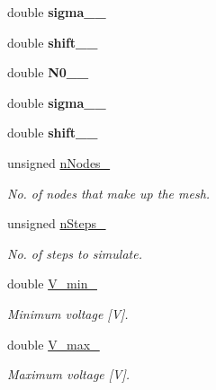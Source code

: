 \begin{DoxyCompactItemize}
\item 
\hypertarget{classParamsList_a049c8b36c29fb765c363cf05610ca9e2}{double {\bfseries sigma\-\_\-\_\-}}\label{classParamsList_a049c8b36c29fb765c363cf05610ca9e2}

\item 
\hypertarget{classParamsList_a29c887174f28cfa06e7ea7fd80185bd7}{double {\bfseries shift\-\_\-\_\-}}\label{classParamsList_a29c887174f28cfa06e7ea7fd80185bd7}

\item 
\hypertarget{classParamsList_a2c548ad5a69cd791b80ba623accf50b3}{double {\bfseries N0\-\_\-\_\-}}\label{classParamsList_a2c548ad5a69cd791b80ba623accf50b3}

\item 
\hypertarget{classParamsList_a8c6b6653287d435a1dce5f3ce3819352}{double {\bfseries sigma\-\_\-\_\-}}\label{classParamsList_a8c6b6653287d435a1dce5f3ce3819352}

\item 
\hypertarget{classParamsList_a966625893d78fcd3c8e989792b500617}{double {\bfseries shift\-\_\-\_\-}}\label{classParamsList_a966625893d78fcd3c8e989792b500617}

\item 
\hypertarget{classParamsList_a8f4bb43717322579edc12974700aec98}{unsigned \hyperlink{classParamsList_a8f4bb43717322579edc12974700aec98}{n\-Nodes\-\_\-}}\label{classParamsList_a8f4bb43717322579edc12974700aec98}

\begin{DoxyCompactList}\small\item\em No. of nodes that make up the mesh. \end{DoxyCompactList}\item 
\hypertarget{classParamsList_af3118b388e4eb4a7ae9831c7aa947f84}{unsigned \hyperlink{classParamsList_af3118b388e4eb4a7ae9831c7aa947f84}{n\-Steps\-\_\-}}\label{classParamsList_af3118b388e4eb4a7ae9831c7aa947f84}

\begin{DoxyCompactList}\small\item\em No. of steps to simulate. \end{DoxyCompactList}\item 
\hypertarget{classParamsList_ac4ae07e3255e2b3f4049da61d0b582ad}{double \hyperlink{classParamsList_ac4ae07e3255e2b3f4049da61d0b582ad}{V\-\_\-min\-\_\-}}\label{classParamsList_ac4ae07e3255e2b3f4049da61d0b582ad}

\begin{DoxyCompactList}\small\item\em Minimum voltage \mbox{[}V\mbox{]}. \end{DoxyCompactList}\item 
\hypertarget{classParamsList_adfe385de93c027c018dbb12b622e9d26}{double \hyperlink{classParamsList_adfe385de93c027c018dbb12b622e9d26}{V\-\_\-max\-\_\-}}\label{classParamsList_adfe385de93c027c018dbb12b622e9d26}

\begin{DoxyCompactList}\small\item\em Maximum voltage \mbox{[}V\mbox{]}. \end{DoxyCompactList}\end{DoxyCompactItemize}
